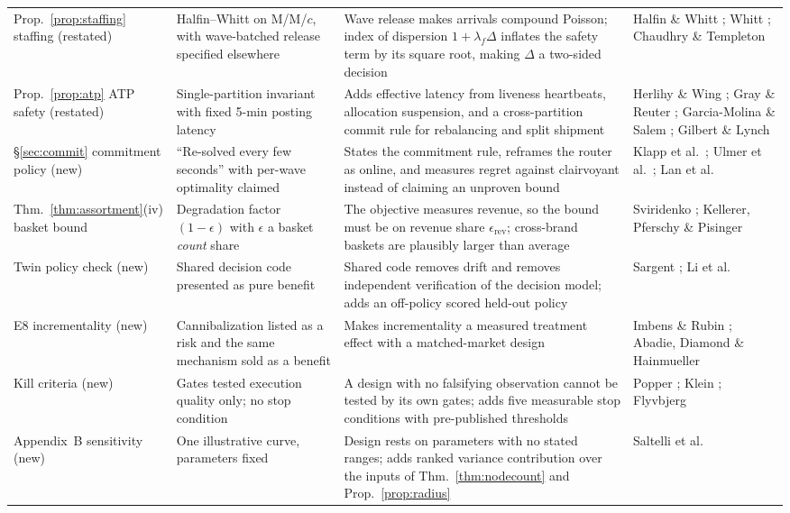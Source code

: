 \begin{table}[t]
\begin{tabular}{@{}p{2.5cm}p{5.4cm}p{5.4cm}p{3.0cm}@{}}
Prop.~\ref{prop:staffing} staffing (restated) & Halfin--Whitt on M/M/$c$, with wave-batched release specified elsewhere & Wave release makes arrivals compound Poisson; index of dispersion $1+\lambda_f\Delta$ inflates the safety term by its square root, making $\Delta$ a two-sided decision & Halfin \& Whitt \cite{halfin1981}; Whitt \cite{whitt1993,whitt2004}; Chaudhry \& Templeton \cite{chaudhry1983}\\
Prop.~\ref{prop:atp} ATP safety (restated) & Single-partition invariant with fixed 5-min posting latency & Adds effective latency from liveness heartbeats, allocation suspension, and a cross-partition commit rule for rebalancing and split shipment & Herlihy \& Wing \cite{herlihy1990}; Gray \& Reuter \cite{gray1993}; Garcia-Molina \& Salem \cite{garciamolina1987}; Gilbert \& Lynch \cite{gilbert2002}\\
\S\ref{sec:commit} commitment policy (new) & ``Re-solved every few seconds'' with per-wave optimality claimed & States the commitment rule, reframes the router as online, and measures regret against clairvoyant instead of claiming an unproven bound & Klapp et al.\ \cite{klapp2018}; Ulmer et al.\ \cite{ulmer2021}; Lan et al.\ \cite{lan2024}\\
Thm.~\ref{thm:assortment}(iv) basket bound & Degradation factor $(1-\epsilon)$ with $\epsilon$ a basket \emph{count} share & The objective measures revenue, so the bound must be on revenue share $\epsilon_{\mathrm{rev}}$; cross-brand baskets are plausibly larger than average & Sviridenko \cite{sviridenko2004}; Kellerer, Pferschy \& Pisinger \cite{kellerer2004}\\
Twin policy check (new) & Shared decision code presented as pure benefit & Shared code removes drift and removes independent verification of the decision model; adds an off-policy scored held-out policy & Sargent \cite{sargent2013}; Li et al.\ \cite{li2011}\\
E8 incrementality (new) & Cannibalization listed as a risk and the same mechanism sold as a benefit & Makes incrementality a measured treatment effect with a matched-market design & Imbens \& Rubin \cite{imbens2015}; Abadie, Diamond \& Hainmueller \cite{abadie2010}\\
Kill criteria (new) & Gates tested execution quality only; no stop condition & A design with no falsifying observation cannot be tested by its own gates; adds five measurable stop conditions with pre-published thresholds & Popper \cite{popper1959}; Klein \cite{klein2007}; Flyvbjerg \cite{flyvbjerg2006}\\
Appendix~B sensitivity (new) & One illustrative curve, parameters fixed & Design rests on parameters with no stated ranges; adds ranked variance contribution over the inputs of Thm.~\ref{thm:nodecount} and Prop.~\ref{prop:radius} & Saltelli et al.\ \cite{saltelli2008}\\
\bottomrule
\end{tabular}
\end{table}


